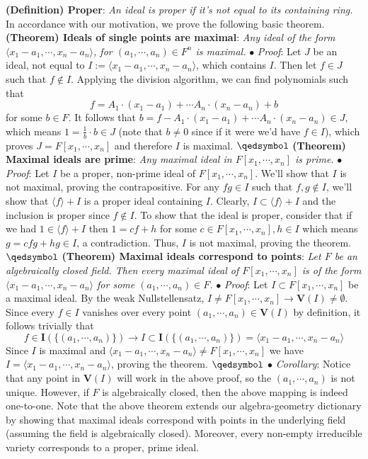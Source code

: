 \documentclass{article}
\newcommand*{\tb}{\textbf}
\newcommand*{\ti}{\textit}
\newcommand*{\n}{\newline}
\newcommand*{\nn}{\newline \newline}
\newcommand*{\Pf}{\indent \ensuremath{\bullet} \textit{Proof}: }
\newcommand*{\Co}{\indent \ensuremath{\bullet} \textit{Corollary}: }
\newcommand*{\Fx}{\ensuremath{F[x_1, \cdots, x_n]}}
\newcommand*{\I}{\ensuremath{\mathbf{I}}}
\newcommand*{\VI}{\ensuremath{\mathbf{V}(I)}}
\begin{document}
\nn
\tb{(Definition) Proper}: \ti{An ideal is proper if it's not equal to its containing ring.}
\nn
In accordance with our motivation, we prove the following basic theorem.
\nn
\tb{(Theorem) Ideals of single points are maximal}: \ti{Any ideal of the form $ \langle x_1 - a_1, \cdots, x_n - a_n \rangle $, for $ (a_1, \cdots, a_n) \in F^n $ is maximal.}
\n
\Pf Let $ J $ be an ideal, not equal to $ I := \langle x_1 - a_1, \cdots, x_n - a_n \rangle $, which contains $ I $. Then let $ f \in J $ such that $ f \notin I $. Applying the division algorithm, we can find polynomials such that
$$ f = A_1 \cdot (x_1 - a_1) + \cdots A_n \cdot (x_n - a_n) + b $$
for some $ b \in F $. It follows that $ b = f - A_1 \cdot (x_1 - a_1) + \cdots A_n \cdot (x_n - a_n) \in J $, which means $ 1 = \frac{1}{b} \cdot b \in J $ (note that $ b \neq 0 $ since if it were we'd have $ f \in I $), which proves $ J = \Fx $ and therefore $ I $ is maximal. $ \qedsymbol $
\nn
\tb{(Theorem) Maximal ideals are prime}: \ti{Any maximal ideal in $ \Fx $ is prime.}
\n
\Pf Let $ I $ be a proper, non-prime ideal of $ \Fx $. We'll show that $ I $ is not maximal, proving the contrapositive. For any $ f g \in I $ such that $ f, g \notin I $, we'll show that $ \langle f \rangle + I $ is a proper ideal containing $ I $. Clearly, $ I \subset \langle f \rangle + I $ and the inclusion is proper since $ f \notin I $. To show that the ideal is proper, consider that if we had $ 1 \in \langle f \rangle + I $ then $ 1 = c f + h $ for some $ c \in \Fx, h \in I $ which means $ g = c f g + h g \in I $, a contradiction. Thus, $ I $ is not maximal, proving the theorem. $ \qedsymbol $
\nn
\tb{(Theorem) Maximal ideals correspond to points}: \ti{Let $ F $ be an algebraically closed field. Then every maximal ideal of $ \Fx $ is of the form $ \langle x_1 - a_1, \cdots, x_n - a_n \rangle $ for some $ (a_1, \cdots, a_n) \in F $.}
\n
\Pf Let $ I \subset \Fx $ be a maximal ideal. By the weak Nullstellensatz, $ I \neq \Fx \rightarrow \VI \neq \emptyset $. Since every $ f \in I $ vanishes over every point $ (a_1, \cdots, a_n) \in \VI $ by definition, it follows trivially that
$$ f \in \I(\{ (a_1, \cdots, a_n) \}) \rightarrow I \subset \I(\{ (a_1, \cdots, a_n) \}) = \langle x_1 - a_1, \cdots, x_n - a_n \rangle $$
Since $ I $ is maximal and $ \langle x_1 - a_1, \cdots, x_n - a_n \rangle \neq \Fx $ we have $ I = \langle x_1 - a_1, \cdots, x_n - a_n \rangle $, proving the theorem. $ \qedsymbol $
\n
\Co Notice that any point in $ \VI $ will work in the above proof, so the $ (a_1, \cdots, a_n) $ is not unique. However, if $ F $ is algebraically closed, then the above mapping is indeed one-to-one.
\nn
Note that the above theorem extends our algebra-geometry dictionary by showing that maximal ideals correspond with points in the underlying field (assuming the field is algebraically closed). Moreover, every non-empty irreducible variety corresponds to a proper, prime ideal.
\end{document}
